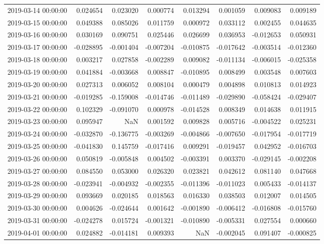 \begin{tabular}{lrrrrrrr}
2019-03-14 00:00:00 & 0.024654 & 0.023020 & 0.000774 & 0.013294 & 0.001059 & 0.009083 & 0.009189 \\
2019-03-15 00:00:00 & 0.049388 & 0.085026 & 0.011759 & 0.000972 & 0.033112 & 0.002455 & 0.044635 \\
2019-03-16 00:00:00 & 0.030169 & 0.090751 & 0.025446 & 0.026699 & 0.036953 & -0.012653 & 0.050931 \\
2019-03-17 00:00:00 & -0.028895 & -0.001404 & -0.007204 & -0.010875 & -0.017642 & -0.003514 & -0.012360 \\
2019-03-18 00:00:00 & 0.003217 & 0.027858 & -0.002289 & 0.009082 & -0.011134 & -0.006015 & -0.025358 \\
2019-03-19 00:00:00 & 0.041884 & -0.003668 & 0.008847 & -0.010895 & 0.008499 & 0.003548 & 0.007603 \\
2019-03-20 00:00:00 & 0.027313 & 0.006052 & 0.008104 & 0.000479 & 0.004898 & 0.010813 & 0.014923 \\
2019-03-21 00:00:00 & -0.019285 & -0.159008 & -0.014746 & -0.011489 & -0.029890 & -0.058424 & -0.029407 \\
2019-03-22 00:00:00 & 0.102329 & -0.091070 & 0.000978 & -0.014528 & 0.008349 & 0.014638 & 0.011915 \\
2019-03-23 00:00:00 & 0.095947 & NaN & 0.001592 & 0.009828 & 0.005716 & -0.004522 & 0.025231 \\
2019-03-24 00:00:00 & -0.032870 & -0.136775 & -0.003269 & -0.004866 & -0.007650 & -0.017954 & -0.017719 \\
2019-03-25 00:00:00 & -0.041830 & 0.145759 & -0.017416 & 0.009291 & -0.019457 & 0.042952 & -0.016703 \\
2019-03-26 00:00:00 & 0.050819 & -0.005848 & 0.004502 & -0.003391 & 0.003370 & -0.029145 & -0.002208 \\
2019-03-27 00:00:00 & 0.084550 & 0.053000 & 0.026320 & 0.023821 & 0.042612 & 0.081140 & 0.047668 \\
2019-03-28 00:00:00 & -0.023941 & -0.004932 & -0.002355 & -0.011396 & -0.011023 & 0.005433 & -0.014137 \\
2019-03-29 00:00:00 & 0.093669 & 0.020185 & 0.018563 & 0.016330 & 0.038503 & 0.012007 & 0.014505 \\
2019-03-30 00:00:00 & 0.004626 & -0.024644 & 0.001642 & -0.001890 & -0.006412 & -0.016808 & -0.015760 \\
2019-03-31 00:00:00 & -0.024278 & 0.015724 & -0.001321 & -0.010890 & -0.005331 & 0.027554 & 0.000660 \\
2019-04-01 00:00:00 & 0.024882 & -0.014181 & 0.009393 & NaN & -0.002045 & 0.091407 & -0.000825 \\

\end{tabular}
